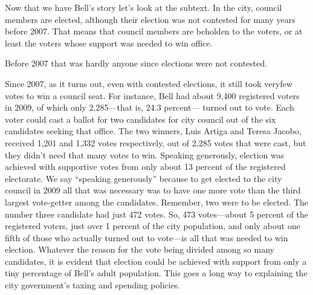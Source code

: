 \documentclass[10pt]{article}
\begin{document}
{\large Now that we have Bell's story let's look at the subtext. In the city,
council members are elected, although their election was not contested for many
years before 2007. That means that council members are beholden to the voters, or
at least the voters whose support was needed to win office.}

{\large Before 2007 that was hardly anyone since elections were not contested.}

{\large Since 2007, as it turns out, even with contested elections, it still
took veryfew votes to win a council seat. For instance, Bell had about 9,400
registered voters in 2009, of which only 2,285---that is, 24.3 percent--- turned
out to vote. Each voter could cast a ballot for two candidates for city council
out of the six candidates seeking that office. The two winners, Luis Artiga and
Teresa Jacobo, received 1,201 and 1,332 votes respectively, out of 2,285 votes
that were cast, but they didn't need that many votes to win. Speaking generously,
election was achieved with supportive votes from only about 13 percent of the
registered electorate. We say ``speaking generously'' because to get elected to
the city council in 2009 all that was necessary was to have one more vote than
the third largest vote-getter among the candidates. Remember, two were to be
elected. The number three candidate had just 472 votes. So, 473 votes---about 5
percent of the registered voters, just over 1 percent of the city population, and
only about one fifth of those who actually turned out to vote---is all that was
needed to win election. Whatever the reason for the vote being divided among so
many candidates, it is evident that election could be achieved with support from
only a tiny percentage of Bell's adult population. This goes a long way to
explaining the city government's taxing and spending policies.}
\end{document}
